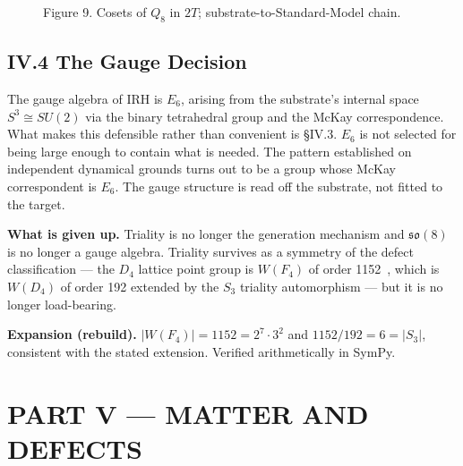 \documentclass[11pt,a4paper]{article}
\newcommand{\expansion}[1]{\par\smallskip\noindent\textbf{Expansion (rebuild).} #1\par\smallskip}
\begin{document}
\begin{figure}[h]
\centering
{}
\caption{Figure 9. Cosets of $Q_8$ in $2T$; substrate-to-Standard-Model chain.}
\end{figure}

\subsection{IV.4 The Gauge Decision}
The gauge algebra of IRH is $E_6$, arising from the substrate's internal space $S^3 \cong SU(2)$ via the binary tetrahedral group and the McKay correspondence. What makes this defensible rather than convenient is \S IV.3. $E_6$ is not selected for being large enough to contain what is needed. The pattern established on independent dynamical grounds turns out to be a group whose McKay correspondent is $E_6$. The gauge structure is read off the substrate, not fitted to the target.

\textbf{What is given up.} Triality is no longer the generation mechanism and $\mathfrak{so}(8)$ is no longer a gauge algebra. Triality survives as a symmetry of the defect classification --- the $D_4$ lattice point group is $W(F_4)$ of order 1152~\cite{conway1999}, which is $W(D_4)$ of order 192 extended by the $S_3$ triality automorphism --- but it is no longer load-bearing.
\expansion{$|W(F_4)| = 1152 = 2^7\cdot 3^2$ and $1152/192 = 6 = |S_3|$, consistent with the stated extension. Verified arithmetically in SymPy.}

\section{PART V --- MATTER AND DEFECTS}
\end{document}
